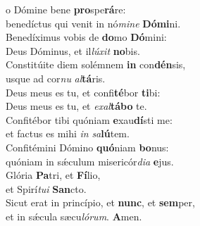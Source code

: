 \evenverse  o Dómine bene \textbf{pro}spe\textbf{rá}re:~\*\\
\evenverse benedíctus qui venit in nó\textit{mi}\textit{ne} \textbf{Dó}\textbf{mi}ni.\\
\oddverse Benedíximus vobis de \textbf{do}mo \textbf{Dó}mini:~\*\\
\oddverse Deus Dóminus, et il\textit{lú}\textit{xit} \textbf{no}bis.\\
\evenverse Constitúite diem solémnem \textbf{in} con\textbf{dén}sis,~\*\\
\evenverse usque ad cor\textit{nu} \textit{al}\textbf{tá}ris.\\
\oddverse Deus meus es tu, et confi\textbf{té}bor \textbf{ti}bi:~\*\\
\oddverse Deus meus es tu, et \textit{e}\textit{xal}\textbf{tá}\textbf{bo} te.\\
\evenverse Confitébor tibi quóniam \textbf{e}xau\textbf{dí}sti me:~\*\\
\evenverse et factus es mihi \textit{in} \textit{sa}\textbf{lú}tem.\\
\oddverse Confitémini Dómino \textbf{quó}niam \textbf{bo}nus:~\*\\
\oddverse quóniam in sǽculum misericór\textit{di}\textit{a} \textbf{e}jus.\\
\evenverse Glória \textbf{Pa}tri, et \textbf{Fí}lio,~\*\\
\evenverse et Spirí\textit{tu}\textit{i} \textbf{San}cto.\\
\oddverse Sicut erat in princípio, et \textbf{nunc}, et \textbf{sem}per,~\*\\
\oddverse et in sǽcula sæcu\textit{ló}\textit{rum}. \textbf{A}men.\\
